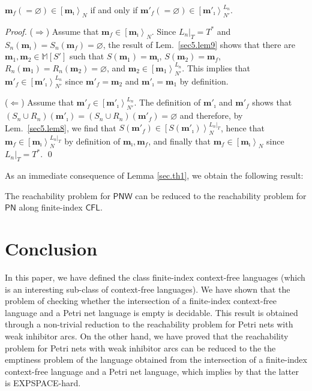\documentclass{fsttcs}
\newcommand{\multiset}[1]{{\mathbb{M}[ #1 ]}}
\def\mmap{\mathbf{m}}
\newcommand{\fire}[1]{\left[ {#1}\right\rangle}
\def\cfl{\mathsf{CFL}}
\def\pn{\mathsf{PN}}
\def\pnw{\mathsf{PNW}}
\begin{document}
\begin{lemma}
\label{sec.th1}
\(\mmap_f (=\varnothing) \in \fire{\mmap_{\imath}}_N\) if and only if \(\mmap'_f (=\varnothing) \in \fire{\mmap'_{\imath}}^{L_n}_{N'}\).
\end{lemma}
\begin{proof}
({\em $\Rightarrow$}) Assume that $\mmap_f \in \fire{\mmap_{\imath}}_N$. 
Since $L_n|_T=T^*$ and
$S_{n}(\mmap_{\imath})=S_{n}(\mmap_f)=\varnothing$, the result of Lem.~\ref{sec5.lem9}
shows that there are $\mmap_1, \mmap_2  \in \multiset{S'}$ such that
$S(\mmap_1)=\mmap_{\imath}$, $S(\mmap_2)=\mmap_f$, $R_{n}(\mmap_1)=R_{n}(\mmap_2)=\varnothing$,
and $\mmap_2 \in \fire{\mmap_{1}}^{L_n}_{N'}$. This implies that $\mmap'_f
\in \fire{\mmap'_{\imath}}^{L_n}_{N'}$ since $\mmap'_f=\mmap_2$ and
$\mmap'_{\imath}=\mmap_1$ by definition.

\medskip
\noindent
({\em $\Leftarrow$}) Assume that $\mmap'_f \in
\fire{\mmap'_{\imath}}^{L_n}_{N'}$. 
The definition of \(\mmap'_{\imath}\) and \(\mmap'_f\)  shows that
\( (S_n\cup R_n)(\mmap'_{\imath})=(S_n\cup R_n)(\mmap'_f)=\varnothing \)
and therefore,  by Lem.~\ref{sec5.lem8}, we find 
that $S(\mmap'_f) \in \fire{S(\mmap'_{\imath})}^{L_n|_T}_N$, hence that
\(\mmap_f \in\fire{\mmap_{\imath}}^{L_n|_T}_N\) by definition of \(\mmap_{\imath}, \mmap_f\), and finally that \(\mmap_f \in\fire{\mmap_{\imath}}_N\) since \({L_n|_T}=T^{*}\).
\qed
\end{proof}



As an immediate consequence of Lemma \ref{sec.th1}, we obtain the following
result:

\begin{corollary}
The reachability problem for \(\pnw\) can be reduced to the reachability problem for
\(\pn\) along finite-index \(\cfl\). 
\end{corollary}
 

\section{Conclusion}
In this paper, we have defined  the class finite-index context-free languages  (which is an interesting sub-class of  context-free languages). We have shown that  the problem of checking whether the intersection of a finite-index context-free language and a Petri net language is empty is decidable. This result is obtained through a non-trivial reduction to  the reachability problem for Petri nets with weak inhibitor arcs. On the other hand, we have proved that the reachability problem for Petri nets with weak inhibitor arcs  can be reduced to the the emptiness problem of the language obtained from the intersection of a finite-index context-free language and a Petri net language, which implies by \cite{Lipton} that the latter is EXPSPACE-hard.
\end{document}
